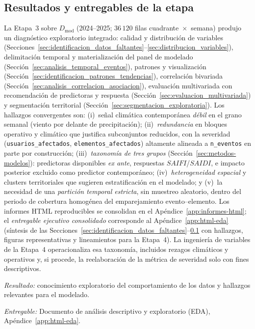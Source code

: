 \subsection{Resultados y entregables de la etapa}
\label{sec:resultados_eda}
    La Etapa~3 sobre $D_{\mathrm{mod}}$ (2024--2025; $36\,120$ filas cuadrante~$\times$~semana) produjo un diagnóstico exploratorio integrado: calidad y distribución de variables (Secciones~\ref{sec:identificacion_datos_faltantes}--\ref{sec:distribucion_variables}), delimitación temporal y materialización del panel de modelado (Sección~\ref{sec:analisis_temporal_eventos}), patrones y visualización (Sección~\ref{sec:identificacion_patrones_tendencias}), correlación bivariada (Sección~\ref{sec:analisis_correlacion_asociacion}), evaluación multivariada con recomendación de predictoras y respuesta (Sección~\ref{sec:evaluacion_multivariada}) y segmentación territorial (Sección~\ref{sec:segmentacion_exploratoria}). Los hallazgos convergentes son: (i)~señal climática contemporánea \textit{débil} en el grano semanal (viento por delante de precipitación); (ii)~\textit{redundancia} en bloques operativo y climático que justifica subconjuntos reducidos, con la severidad (\texttt{usuarios\_afectados}, \texttt{elementos\_afectados}) altamente alineada a \texttt{n\_eventos} en parte por construcción; (iii)~\textit{taxonomía de tres grupos} (Sección~\ref{sec:metodos-modelos}): predictoras disponibles \emph{ex ante}, respuestas $SAIFI$/$SAIDI$, e impacto posterior excluido como predictor contemporáneo; (iv)~\textit{heterogeneidad espacial} y clusters territoriales que sugieren estratificación en el modelado; y (v)~la necesidad de una \textit{partición temporal estricta}, sin muestreo aleatorio, dentro del periodo de cobertura homogénea del emparejamiento evento--elemento. Los informes HTML reproducibles se consolidan en el Apéndice~\ref{app:informes-html}; el \textit{entregable ejecutivo consolidado} corresponde al Apéndice~\ref{app:html-eda} (síntesis de las Secciones~\ref{sec:identificacion_datos_faltantes}--\ref{sec:resultados_eda} con hallazgos, figuras representativas y lineamientos para la Etapa~4). La ingeniería de variables de la Etapa~4 operacionaliza esa taxonomía, incluidos rezagos climáticos y operativos y, si procede, la reelaboración de la métrica de severidad solo con fines descriptivos.
    
    \textit{Resultado:} conocimiento exploratorio del comportamiento de los datos y hallazgos relevantes para el modelado.
    
    \textit{Entregable:} Documento de análisis descriptivo y exploratorio (EDA), Apéndice~\ref{app:html-eda}.
    

